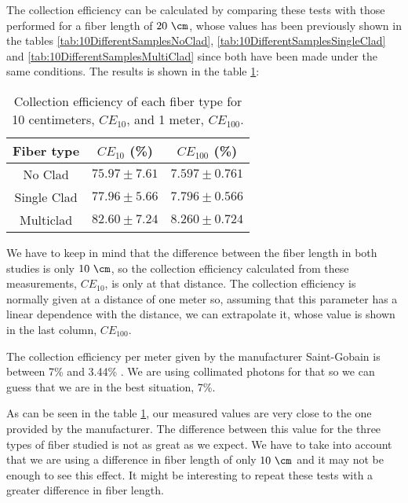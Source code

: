 The collection efficiency can be calculated by comparing these tests with those performed for a fiber length of $20~\cm$, whose values has been previously shown in the tables \ref{tab:10DifferentSamplesNoClad}, \ref{tab:10DifferentSamplesSingleClad} and \ref{tab:10DifferentSamplesMultiClad} since both have been made under the same conditions. The results is shown in the table \ref{tab:CollectionEfficiencyOfFibers}:



\begin{table}[htbp]
\begin{center}
\begin{tabular}{|c|c|c|}
\hline
Fiber type & $CE_{10}$ (\%) & $CE_{100}$ (\%) \\\hline \hline \hline
No Clad & $75.97 \pm 7.61$ & $7.597 \pm 0.761$ \\ \hline
Single Clad & $77.96 \pm 5.66$ & $7.796 \pm 0.566$ \\ \hline
Multiclad & $82.60 \pm 7.24$ & $8.260 \pm 0.724$ \\ \hline
\end{tabular}
\caption{Collection efficiency of each fiber type for 10 centimeters, $CE_{10}$, and 1 meter, $CE_{100}$.}
\label{tab:CollectionEfficiencyOfFibers}
\end{center}
\end{table}

We have to keep in mind that the difference between the fiber length in both studies is only $10~\cm$, so the collection efficiency calculated from these measurements, $CE_{10}$, is only at that distance. The collection efficiency is normally given at a distance of one meter so, assuming that this parameter has a linear dependence with the distance, we can extrapolate it, whose value is shown in the last column, $CE_{100}$.

The collection efficiency per meter given by the manufacturer Saint-Gobain is between 7\% and 3.44\% \cite{DataSheetBCF12Fiber}. We are using collimated photons for that so we can guess that we are in the best situation, 7\%. 

As can be seen in the table \ref{tab:CollectionEfficiencyOfFibers}, our measured values are very close to the one provided by the manufacturer. The difference between this value for the three types of fiber studied is not as great as we expect. We have to take into account that we are using a difference in fiber length of only $10~\cm$ and it may not be enough to see this effect. It might be interesting to repeat these tests with a greater difference in fiber length.